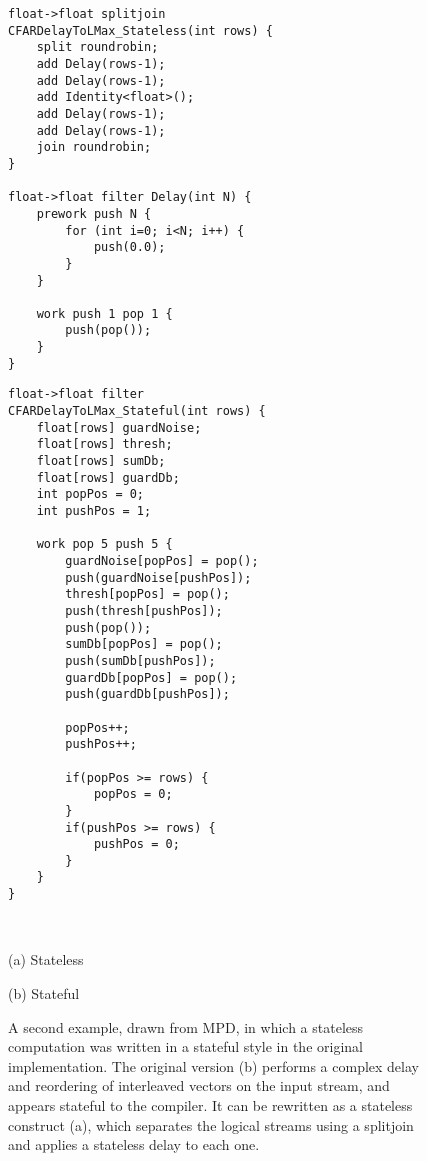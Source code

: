 \begin{figure}[t]
\begin{minipage}{0.5\textwidth}
\centering
\ninepoint
\begin{verbatim}
float->float splitjoin 
CFARDelayToLMax_Stateless(int rows) {
    split roundrobin;
    add Delay(rows-1);
    add Delay(rows-1);
    add Identity<float>();
    add Delay(rows-1);
    add Delay(rows-1);
    join roundrobin;
}

float->float filter Delay(int N) {
    prework push N {
        for (int i=0; i<N; i++) {
            push(0.0);
        }
    }

    work push 1 pop 1 {
        push(pop());
    }
}
\end{verbatim}
\end{minipage}
\begin{minipage}{0.5\textwidth}
\centering
\ninepoint
\begin{verbatim}
float->float filter
CFARDelayToLMax_Stateful(int rows) {
    float[rows] guardNoise;
    float[rows] thresh;
    float[rows] sumDb;
    float[rows] guardDb;
    int popPos = 0;
    int pushPos = 1;

    work pop 5 push 5 {
        guardNoise[popPos] = pop();
        push(guardNoise[pushPos]);
        thresh[popPos] = pop();
        push(thresh[pushPos]);
        push(pop());
        sumDb[popPos] = pop();
        push(sumDb[pushPos]);
        guardDb[popPos] = pop();
        push(guardDb[pushPos]);

        popPos++;
        pushPos++;

        if(popPos >= rows) {
            popPos = 0;
        }
        if(pushPos >= rows) {
            pushPos = 0;
        }
    }
}
\end{verbatim}
\end{minipage}
~ \\
\begin{minipage}{0.5\textwidth}
\centering
(a) Stateless
\end{minipage}
\begin{minipage}{0.5\textwidth}
\centering
(b) Stateful
\end{minipage}
\caption[Accidental introduction of filter state (real example).]{A 
  second example, drawn from MPD, in which a stateless computation was
  written in a stateful style in the original implementation.  The
  original version (b) performs a complex delay and reordering of
  interleaved vectors on the input stream, and appears stateful to the
  compiler.  It can be rewritten as a stateless construct (a), which
  separates the logical streams using a splitjoin and applies a
  stateless delay to each one.\protect\label{fig:state2}}
\end{figure}

